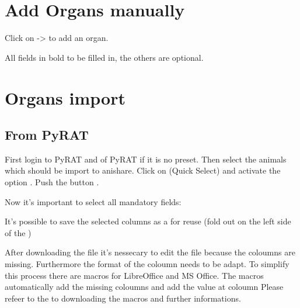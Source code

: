 \documentclass[letterpaper,10pt,openany,oneside,english]{sphinxmanual}
\begin{document}
\section{Add Organs manually}
\label{\detokenize{index:add-organs-manually}}
Click on  -\textgreater{}  to add an organ.

\noindent{}

All fields in bold  to be filled in, the others are optional.


\section{Organs import}
\label{\detokenize{index:organs-import}}

\subsection{From PyRAT}
\label{\detokenize{index:id1}}
First login to PyRAT and  of PyRAT if it is no preset. Then select the animals which
should be import to anishare. Click on  (Quick Select) and activate the option .
Push the button .

Now it’s important to select all mandatory fields:

\noindent{}

It’s possible to save the selected columns as a  for reuse (fold out  on the left side of the )

After downloading the file it’s nessecary to edit the file because the coloumns  are missing.
Furthermore the format of the coloumn  needs to be adapt.
To simplify this process there are macros for LibreOffice and MS Office. The macros automatically add the missing coloumns and add the value
 at coloumn 
Please refeer to the  to downloading the macros and further informations.
\end{document}
